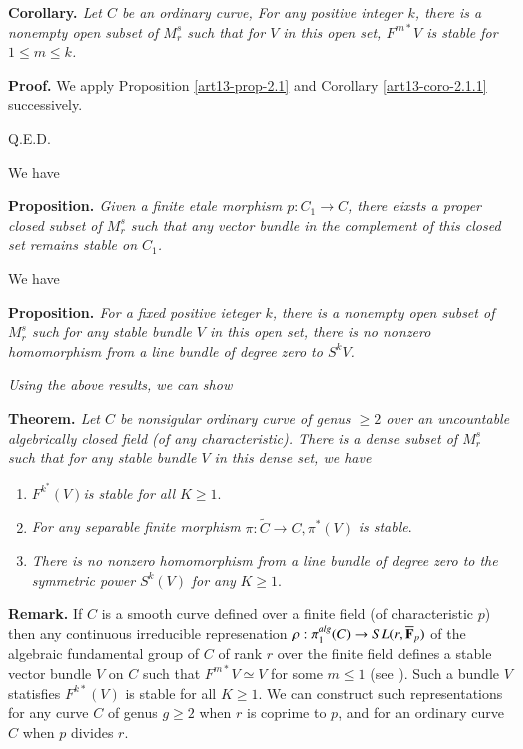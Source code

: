\medskip
\noindent
{\bfseries {} Corollary. \label{art13-coro-2.1.2}} \textit{Let $C$ be an ordinary curve, For any positive integer $k$, there is a nonempty open subset of $M_{r}^{s}$ such that for $V$ in this open set, $F^{m*}V$ is stable for
$1 \leq m \leq k$. }

\medskip
\noindent
{\bfseries Proof.} We apply Proposition \eqref{art13-prop-2.1} and Corollary \eqref{art13-coro-2.1.1} successively.

\hfill Q.E.D.

We have

\medskip
\noindent
{\bfseries {} Proposition. \label{art13-prop-2.2}} \textit{Given a finite etale morphism $p : C_{1} \rightarrow C$, there eixsts a proper closed subset of $M_{r}^{s}$ such that any vector bundle in the complement of this closed set remains  stable on $C_{1}$.} 

We have

\medskip
\noindent
{\bfseries {} Proposition. \label{art13-prop-2.3}} \textit{For a fixed positive ieteger $k$, there is a nonempty open subset of $M_{r}^{s}$  such for any stable bundle $V$  in this open set, there is no nonzero homomorphism from a line bundle of degree zero to $S^{k}V$.}

\textit{Using the above results, we can show
}

\medskip
\noindent
{\bfseries {} Theorem. \label{art13-thm-2.4}} \textit{Let $C$ be nonsigular ordinary curve of genus $\geq 2$ over an uncountable algebrically closed field (of any characteristic). There is a dense subset of $M_{r}^{s}$ such that for any stable bundle $V$ in this dense set, we have}
\begin{enumerate}[\it 1)]
\item $F^{k^{*}}(V)$\textit{is stable for all} $K \geq 1$.\label{art13-thm2.4-enum-1}

\item \textit{For any separable finite morphism} $\pi : \tilde{C} \rightarrow C, \pi^{*}(V)$ \textit{is stable}.\label{art13-thm2.4-enum-2}

\item \textit{There is no nonzero homomorphism from a line bundle of degree zero to the symmetric power} $S^{k}(V)$
 \textit{for any} $K \geq 1$.\label{art13-thm2.4-enum-3}
\end{enumerate}

\medskip
\noindent
{\bfseries Remark.} If $C$ is a smooth curve defined over a finite field (of characteristic $p$) then any continuous irreducible represenation $\rho : \pi_{1}^{alg}(C)\rightarrow SL(r, \overline{\mathbf{F}}_{p})$ of the algebraic fundamental group of $C$ of rank $r$ over the finite field defines a stable vector bundle $V$ on $C$ such that $F^{m*}V \simeq V$ for some $m \leq 1$ (see \cite{art13-key4}). Such a bundle $V$ statisfies $F^{k*}(V)$ is stable for all $K \geq 1$. We can construct such representations for any curve $C$ of genus $g \geq 2$ when $r$ is coprime to $p$, and for an ordinary curve $C$ when $p$ divides $r$.


